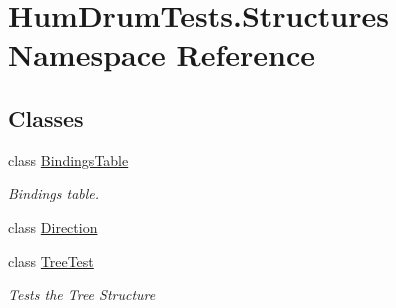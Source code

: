 \hypertarget{namespaceHumDrumTests_1_1Structures}{}\section{Hum\+Drum\+Tests.\+Structures Namespace Reference}
\label{namespaceHumDrumTests_1_1Structures}
\subsection*{Classes}
\begin{DoxyCompactItemize}
\item 
class \hyperlink{classHumDrumTests_1_1Structures_1_1BindingsTable}{Bindings\+Table}
\begin{DoxyCompactList}\small\item\em Bindings table. \end{DoxyCompactList}\item 
class \hyperlink{classHumDrumTests_1_1Structures_1_1Direction}{Direction}
\item 
class \hyperlink{classHumDrumTests_1_1Structures_1_1TreeTest}{Tree\+Test}
\begin{DoxyCompactList}\small\item\em Tests the Tree Structure \end{DoxyCompactList}\end{DoxyCompactItemize}
